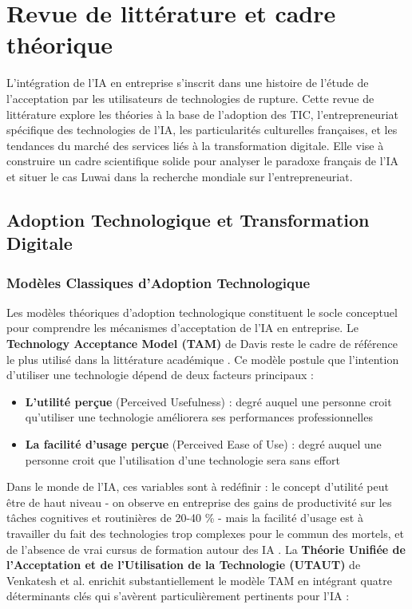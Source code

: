 \chapter{Revue de littérature et cadre théorique}
\label{chap:literature_review}

L'intégration de l'IA en entreprise s'inscrit dans une histoire de l'étude de l'acceptation par les utilisateurs de technologies de rupture. Cette revue de littérature explore les théories à la base de l'adoption des TIC, l'entrepreneuriat spécifique des technologies de l'IA, les particularités culturelles françaises, et les tendances du marché des services liés à la transformation digitale. Elle vise à construire un cadre scientifique solide pour analyser le paradoxe français de l'IA et situer le cas Luwai dans la recherche mondiale sur l'entrepreneuriat.

\section{Adoption Technologique et Transformation Digitale}

\subsection{Modèles Classiques d'Adoption Technologique}

Les modèles théoriques d'adoption technologique constituent le socle conceptuel pour comprendre les mécanismes d'acceptation de l'IA en entreprise. Le \textbf{Technology Acceptance Model (TAM)} de Davis \cite{davis1989perceived} reste le cadre de référence le plus utilisé dans la littérature académique \cite{artimon2025theorie}. Ce modèle postule que l'intention d'utiliser une technologie dépend de deux facteurs principaux :
\medskip
\begin{itemize}
    \item \textbf{L'utilité perçue} (Perceived Usefulness) : degré auquel une personne croit qu'utiliser une technologie améliorera ses performances professionnelles
    \item \textbf{La facilité d'usage perçue} (Perceived Ease of Use) : degré auquel une personne croit que l'utilisation d'une technologie sera sans effort
\end{itemize}
\medskip
Dans le monde de l’IA, ces variables sont à redéfinir : le concept d’utilité peut être de haut niveau - on observe en entreprise des gains de productivité sur les tâches cognitives et routinières de 20-40 \% - mais la facilité d’usage est à travailler du fait des technologies trop complexes pour le commun des mortels, et de l’absence de vrai cursus de formation autour des IA \cite{psicosmart2024resistance}.
\newpage
La \textbf{Théorie Unifiée de l'Acceptation et de l'Utilisation de la Technologie (UTAUT)} de Venkatesh et al. \cite{venkatesh2003user} enrichit substantiellement le modèle TAM en intégrant quatre déterminants clés qui s'avèrent particulièrement pertinents pour l'IA :

